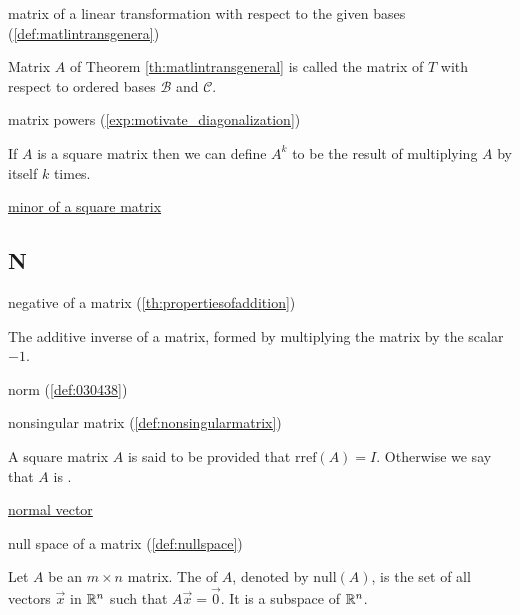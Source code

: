 \documentclass{ximera}
\begin{document}
matrix of a linear transformation with respect to the given bases (\ref{def:matlintransgenera})
\begin{expandable}{}{}
    Matrix $A$ of Theorem \ref{th:matlintransgeneral} is called the matrix of $T$ with respect to ordered bases $\mathcal{B}$ and $\mathcal{C}$.
\end{expandable}

matrix powers (\ref{exp:motivate_diagonalization})
\begin{expandable}{}{}
    If $A$ is a square matrix then we can define $A^k$ to be the result of multiplying $A$ by itself $k$ times.
\end{expandable}

\href{https://ximera.osu.edu/linearalgebradzv3/LinearAlgebraInteractiveIntro/DET-0010/main}{minor of a square matrix}

\subsection*{N}

negative of a matrix
(\ref{th:propertiesofaddition})
\begin{expandable}{}{}
    The additive inverse of a matrix, formed by multiplying the matrix by the scalar $-1$.
\end{expandable}


norm (\ref{def:030438})


nonsingular matrix (\ref{def:nonsingularmatrix})
\begin{expandable}{}{}
    A square matrix $A$ is said to be  provided that $\mbox{rref}(A)=I$.  Otherwise we say that $A$ is .
\end{expandable}

\href{https://ximera.osu.edu/linearalgebradzv3/LinearAlgebraInteractiveIntro/RRN-0030/main}{normal vector}

null space of a matrix (\ref{def:nullspace})
\begin{expandable}{}{}
    Let $A$ be an $m\times n$ matrix.  The  of $A$, denoted by $\mbox{null}(A)$, is the set of all vectors $\vec{x}$ in $\mathbb{R}^n$ such that $A\vec{x}=\vec{0}$.   
    It is a subspace of $\mathbb{R}^n$.
\end{expandable}
\end{document}
